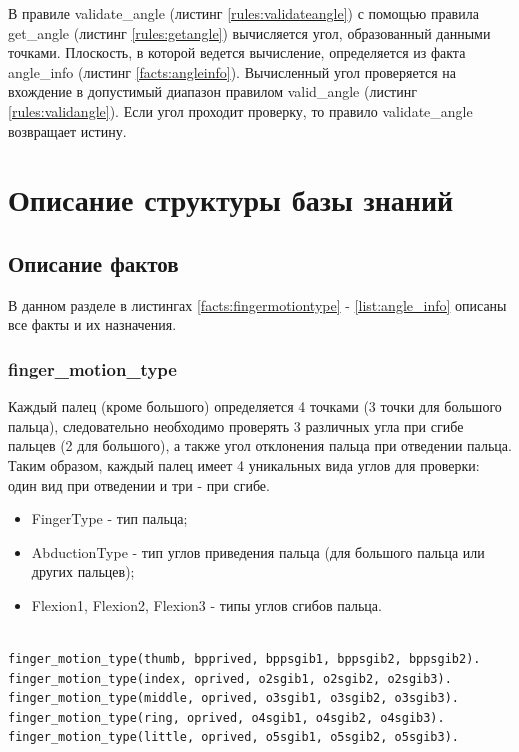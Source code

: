 \hspace{0.6cm} В правиле validate\_angle (листинг \ref{rules:validateangle}) с помощью правила get\_angle (листинг \ref{rules:getangle}) вычисляется угол, образованный данными точками. Плоскость, в которой ведется вычисление, определяется из факта angle\_info (листинг \ref{facts:angleinfo}). Вычисленный угол проверяется на вхождение в допустимый диапазон правилом valid\_angle (листинг \ref{rules:validangle}). Если угол проходит проверку, то правило validate\_angle возвращает истину.

\section{Описание структуры базы знаний}

\subsection{Описание фактов}
\hspace{0.6cm} В данном разделе в листингах \ref{facts:fingermotiontype} - \ref{list:angle_info} описаны все факты и их назначения.
\subsubsection{finger\_motion\_type}
\hspace{0.6cm} Каждый палец (кроме большого) определяется 4 точками (3 точки для большого пальца), следовательно необходимо проверять 3 различных угла при сгибе пальцев (2 для большого), а также угол отклонения пальца при отведении пальца. Таким образом, каждый палец имеет 4 уникальных вида углов для проверки: один вид при отведении и три - при сгибе. 

\begin{itemize}
	\item FingerType - тип пальца;
	\item AbductionType - тип углов приведения пальца (для большого пальца или других пальцев);
	\item Flexion1, Flexion2, Flexion3 - типы углов сгибов пальца.
\end{itemize}

\begin{lstlisting}[caption=Знания о типах проверок каждого пальца, label=facts:fingermotiontype]
%finger_motion_type(FingerType, AbductionType, Flexion1, Flexion2, Flexion3).

finger_motion_type(thumb, bpprived, bppsgib1, bppsgib2, bppsgib2).
finger_motion_type(index, oprived, o2sgib1, o2sgib2, o2sgib3).
finger_motion_type(middle, oprived, o3sgib1, o3sgib2, o3sgib3).
finger_motion_type(ring, oprived, o4sgib1, o4sgib2, o4sgib3).
finger_motion_type(little, oprived, o5sgib1, o5sgib2, o5sgib3).
\end{lstlisting}

